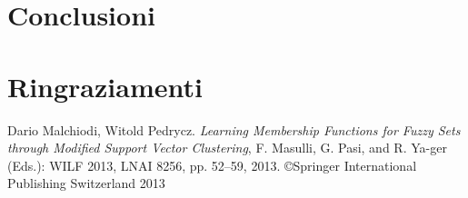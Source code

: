 \documentclass[a4paper,12pt]{report}
\begin{document}
\chapter{Conclusioni}
\label{Conclusioni}

\chapter*{Ringraziamenti}
\label{Ringraziamenti}

%
%
\begin{thebibliography}{00}
%
Dario Malchiodi, Witold Pedrycz. \textit{Learning Membership Functions for Fuzzy Sets through Modified Support Vector Clustering}, F. Masulli, G. Pasi, and R. Ya-ger (Eds.): WILF 2013, LNAI 8256, pp. 52–59, 2013. \copyright Springer International
Publishing Switzerland 2013
\end{thebibliography}
% 
\end{document}
